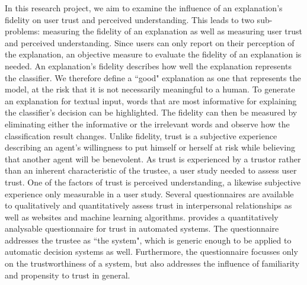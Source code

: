 In this research project, we aim to examine the influence of an explanation's fidelity on user trust and perceived understanding. This leads to two sub-problems: measuring the fidelity of an explanation as well as measuring user trust and perceived understanding.\newline
Since users can only report on their perception of the explanation, an objective measure to evaluate the fidelity of an explanation is needed. An explanation's fidelity describes how well the explanation represents the classifier. We therefore define a ``good" explanation as one that represents the model, at the risk that it is not necessarily meaningful to a human. To generate an explanation for textual input, words that are most informative for explaining the classifier's decision can be highlighted. The fidelity can then be measured by eliminating either the informative or the irrelevant words and observe how the classification result changes. \newline
Unlike fidelity, trust is a subjective experience describing an agent's willingness to put himself or herself at risk while believing that another agent will be benevolent. As trust is experienced by a trustor rather than an inherent characteristic of the trustee, a user study needed to assess user trust. One of the factors of trust is perceived understanding, a likewise subjective experience only measurable in a user study. Several questionnaires are available to qualitatively and quantitatively assess trust in interpersonal relationships as well as websites and machine learning algorithms. \cite{korber2018theoretical} provides a quantitatively analysable questionnaire for trust in automated systems. The questionnaire addresses the trustee as ``the system", which is generic enough to be applied to automatic decision systems as well. Furthermore, the questionnaire focusses only on the trustworthiness of a system, but also addresses the influence of familiarity and propensity to trust in general.













